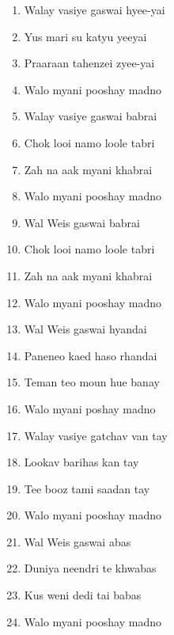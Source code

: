 \documentclass[12pt]{article}
\newcommand{\bigroman}[1]{\fontsize{16pt}{18pt}\selectfont\RaggedRight #1}
\begin{document}
\begin{multicols}{2}
\begin{enumerate}[leftmargin=*, label=\arabic*., font=\fontsize{16pt}{18pt}\selectfont]
  \item \bigroman{Walay vasiye gaswai hyee-yai}
  \item \bigroman{Yus mari su katyu yeeyai}
  \item \bigroman{Praaraan tahenzei zyee-yai}
  \item \bigroman{Walo myani pooshay madno}
  \item \bigroman{Walay vasiye gaswai babrai}
  \item \bigroman{Chok looi namo loole tabri}
  \item \bigroman{Zah na aak myani khabrai}
  \item \bigroman{Walo myani pooshay madno}
  \item \bigroman{Wal Weis gaswai babrai}
  \item \bigroman{Chok looi namo loole tabri}
  \item \bigroman{Zah na aak myani khabrai}
  \item \bigroman{Walo myani pooshay madno}
  \item \bigroman{Wal Weis gaswai hyandai}
  \item \bigroman{Paneneo kaed haso rhandai}
  \item \bigroman{Teman teo moun hue banay}
  \item \bigroman{Walo myani poshay madno}
  \item \bigroman{Walay vasiye gatchav van tay}
  \item \bigroman{Lookav barihas kan tay}
  \item \bigroman{Tee booz tami saadan tay}
  \item \bigroman{Walo myani pooshay madno}
  \item \bigroman{Wal Weis gaswai abas}
  \item \bigroman{Duniya neendri te khwabas}
  \item \bigroman{Kus weni dedi tai babas}
  \item \bigroman{Walo myani pooshay madno}
\end{enumerate}

\columnbreak


\end{multicols}
\end{document}
